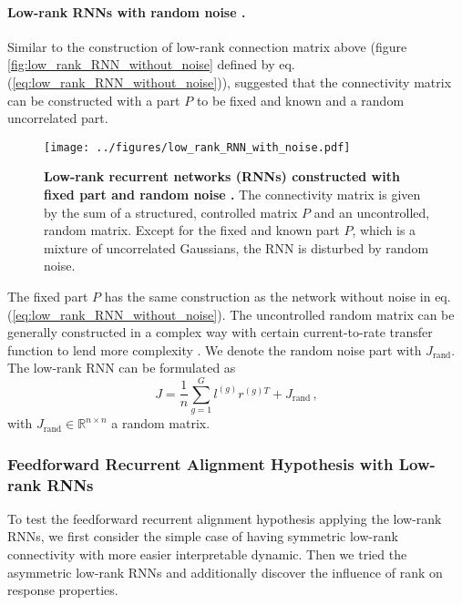 \documentclass[11pt]{article}
\begin{document}
	\paragraph{Low-rank RNNs with random noise \cite{mastrogiuseppe2018linking}.}
	Similar to the construction of low-rank connection matrix above (figure \ref{fig:low_rank_RNN_without_noise} defined by eq.(\ref{eq:low_rank_RNN_without_noise})), \cite{mastrogiuseppe2018linking} suggested that the connectivity matrix can be constructed with a part $P$ to be fixed and known and a random uncorrelated part.
		\begin{figure} [H]
			\centering
			\texttt{[image: ../figures/low\_rank\_RNN\_with\_noise.pdf]}
			\caption[Low-rank recurrent networks (RNNs) constructed with fixed part and random noise]{\textbf{Low-rank recurrent networks (RNNs) constructed with fixed part and random noise \cite{mastrogiuseppe2018linking}.} The connectivity matrix is given by the sum of a structured, controlled matrix $P$ and an uncontrolled, random matrix. Except for the fixed and known part $P$, which is a mixture of uncorrelated Gaussians, the RNN is disturbed by random noise.}
			\label{fig:low_rank_RNN_with_noise}
		\end{figure}
	The fixed part $P$ has the same construction as the network without noise in eq.(\ref{eq:low_rank_RNN_without_noise}). The uncontrolled random matrix can be generally constructed in a complex way with certain current-to-rate transfer function to lend more complexity \cite{mastrogiuseppe2018linking}. We denote the random noise part with $J_{\text{rand}}$. The low-rank RNN can be formulated as
		\begin{equation} \label{eq:low_rank_with_noise}
			J = \frac{1}{n} \sum_{g=1}^{G} l^{(g)} r^{(g)T} + J_{\text{rand}} \, ,
		\end{equation}
	with $J_{\text{rand}} \in \mathbb{R}^{n \times n}$ a random matrix. 
	
	\subsubsection{Feedforward Recurrent Alignment Hypothesis with Low-rank RNNs} \label{sec:ffrec_low_rank}
	To test the feedforward recurrent alignment hypothesis applying the low-rank RNNs, we first consider the simple case of having symmetric low-rank connectivity with more easier interpretable dynamic. Then we tried the asymmetric low-rank RNNs and additionally discover the influence of rank on response properties. 
	
\end{document}
